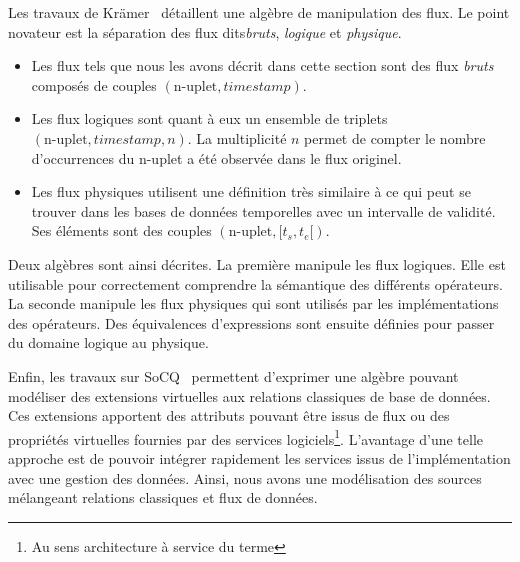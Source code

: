 Les travaux de Krämer~\cite{Kramer:semantics} détaillent une algèbre de manipulation des flux. Le point novateur est la séparation des flux dits\textit{bruts}, \textit{logique} et \textit{physique}. 
\begin{itemize}
	\item Les flux tels que nous les avons décrit dans cette section sont des flux \textit{bruts} composés de couples $(\textrm{n-uplet},\textit{timestamp})$.
	\item Les flux logiques sont quant à eux un ensemble de triplets $(\textrm{n-uplet}, \textit{timestamp}, n)$. La multiplicité $n$ permet de compter le nombre d'occurrences du n-uplet a été observée dans le flux originel.
	\item Les flux physiques utilisent une définition très similaire à ce qui peut se trouver dans les bases de données temporelles avec un intervalle de validité. Ses éléments sont des couples $(\textrm{n-uplet},[t_s, t_e[)$.
\end{itemize} 
Deux algèbres sont ainsi décrites. La première manipule les flux logiques. Elle est utilisable pour correctement comprendre la sémantique des différents opérateurs. La seconde manipule les flux physiques qui sont utilisés par les implémentations des opérateurs. Des équivalences d'expressions sont ensuite définies pour passer du domaine logique au physique.

Enfin, les travaux sur SoCQ~\cite{Gripay:algebra} permettent d'exprimer une algèbre pouvant modéliser des extensions virtuelles aux relations classiques de base de données. Ces extensions apportent des attributs pouvant être issus de flux ou des propriétés virtuelles fournies par des services logiciels\footnote{Au sens architecture à service du terme}. L'avantage d'une telle approche est de pouvoir intégrer rapidement les services issus de l'implémentation avec une gestion des données. Ainsi, nous avons une modélisation des sources mélangeant relations classiques et flux de données.